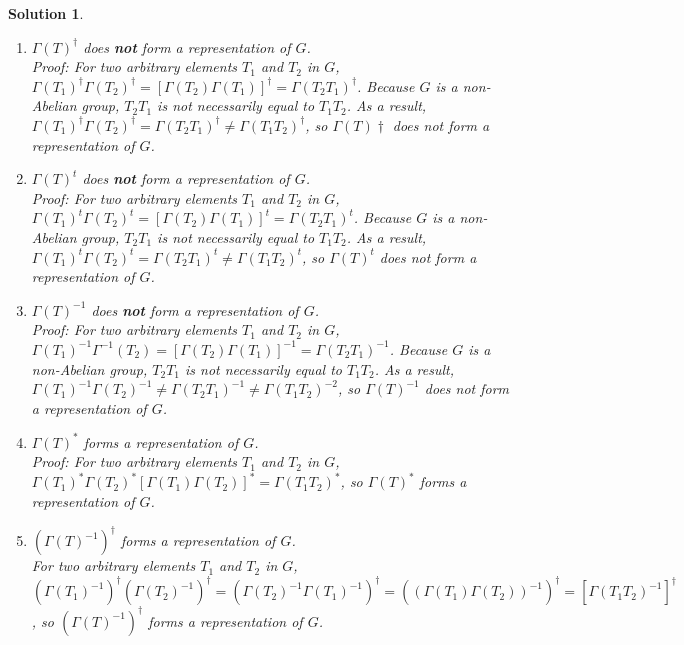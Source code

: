 \documentclass[UTF8,10pt,a4paper]{article}
\theoremstyle{Problem}
\theoremstyle{Solution}
\newtheorem*{sol}{Solution}
\begin{document}
\begin{sol}
    \begin{enumerate}
        \item[(a)] $\Gamma(T)^{\dagger}$ does \textbf{not} form a representation of $G$.\\
        Proof:
        For two arbitrary elements $T_1$ and $T_2$ in $G$, $\Gamma(T_1)^{\dagger}\Gamma(T_2)^{\dagger}=[\Gamma(T_2)\Gamma(T_1)]^{\dagger}=\Gamma(T_2T_1)^{\dagger}$. Because $G$ is a non-Abelian group, $T_2T_1$ is not necessarily equal to $T_1T_2$. As a result, $\Gamma(T_1)^{\dagger}\Gamma(T_2)^{\dagger}=\Gamma(T_2T_1)^{\dagger}\neq\Gamma(T_1T_2)^{\dagger}$, so $\Gamma(T)\dagger$ does not form a representation of $G$.
        \item[(b)] $\Gamma(T)^t$ does \textbf{not} form a representation of $G$.\\
        Proof:
        For two arbitrary elements $T_1$ and $T_2$ in $G$, $\Gamma(T_1)^t\Gamma(T_2)^t=[\Gamma(T_2)\Gamma(T_1)]^t=\Gamma(T_2T_1)^t$. Because $G$ is a non-Abelian group, $T_2T_1$ is not necessarily equal to $T_1T_2$. As a result, $\Gamma(T_1)^t\Gamma(T_2)^t=\Gamma(T_2T_1)^t\neq\Gamma(T_1T_2)^t$, so $\Gamma(T)^t$ does not form a representation of $G$.
        \item[(c)] $\Gamma(T)^{-1}$ does \textbf{not} form a representation of $G$.\\
        Proof:
        For two arbitrary elements $T_1$ and $T_2$ in $G$, $\Gamma(T_1)^{-1}\Gamma^{-1}(T_2)=[\Gamma(T_2)\Gamma(T_1)]^{-1}=\Gamma(T_2T_1)^{-1}$. Because $G$ is a non-Abelian group, $T_2T_1$ is not necessarily equal to $T_1T_2$. As a result, $\Gamma(T_1)^{-1}\Gamma(T_2)^{-1}\neq\Gamma(T_2T_1)^{-1}\neq\Gamma(T_1T_2)^{-2}$, so $\Gamma(T)^{-1}$ does not form a representation of $G$.
        \item[(d)] $\Gamma(T)^*$ forms a representation of $G$.\\
        Proof:
        For two arbitrary elements $T_1$ and $T_2$ in $G$, $\Gamma(T_1)^*\Gamma(T_2)^*[\Gamma(T_1)\Gamma(T_2)]^*=\Gamma(T_1T_2)^*$, so $\Gamma(T)^*$ forms a representation of $G$.
        \item[(e)] $(\Gamma(T)^{-1})^{\dagger}$ forms a representation of $G$.\\
        For two arbitrary elements $T_1$ and $T_2$ in $G$, $(\Gamma(T_1)^{-1})^{\dagger}(\Gamma(T_2)^{-1})^{\dagger}=(\Gamma(T_2)^{-1}\Gamma(T_1)^{-1})^{\dagger}=((\Gamma(T_1)\Gamma(T_2))^{-1})^{\dagger}=[\Gamma(T_1T_2)^{-1}]^{\dagger}$, so $(\Gamma(T)^{-1})^{\dagger}$ forms a representation of $G$.

\end{enumerate}
\end{sol}
\end{document}
